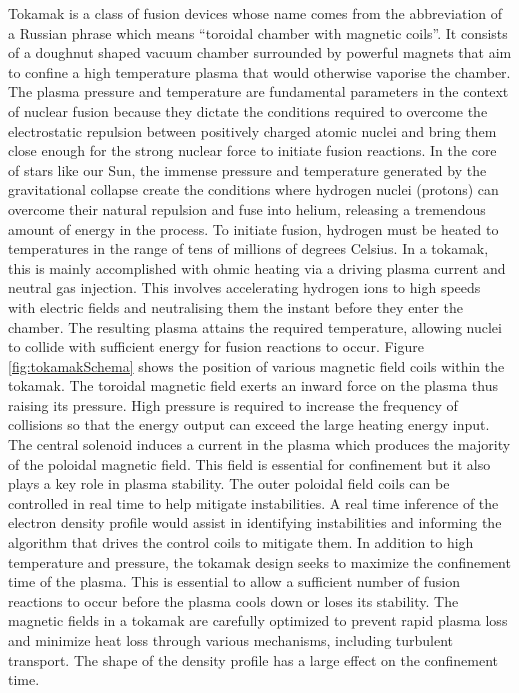 Tokamak is a class of fusion devices whose name comes from the abbreviation of a Russian phrase which means ``toroidal chamber with magnetic coils''. It consists of a doughnut shaped vacuum chamber surrounded by powerful magnets that aim to confine a high temperature plasma that would otherwise vaporise the chamber. The plasma pressure and temperature are fundamental parameters in the context of nuclear fusion because they dictate the conditions required to overcome the electrostatic repulsion between positively charged atomic nuclei and bring them close enough for the strong nuclear force to initiate fusion reactions. In the core of stars like our Sun, the immense pressure and temperature generated by the gravitational collapse create the conditions where hydrogen nuclei (protons) can overcome their natural repulsion and fuse into helium, releasing a tremendous amount of energy in the process. To initiate fusion, hydrogen must be heated to temperatures in the range of tens of millions of degrees Celsius. In a tokamak, this is mainly accomplished with ohmic heating via a driving plasma current and neutral gas injection. This involves accelerating hydrogen ions to high speeds with electric fields and neutralising them the instant before they enter the chamber. The resulting plasma attains the required temperature, allowing nuclei to collide with sufficient energy for fusion reactions to occur. Figure \ref{fig:tokamakSchema} shows the position of various magnetic field coils within the tokamak. The toroidal magnetic field exerts an inward force on the plasma thus raising its pressure. High pressure is required to increase the frequency of collisions so that the energy output can exceed the large heating energy input. The central solenoid induces a current in the plasma which produces the majority of the poloidal magnetic field. This field is essential for confinement but it also plays a key role in plasma stability. The outer poloidal field coils can be controlled in real time to help mitigate instabilities. A real time inference of the electron density profile would assist in identifying instabilities and informing the algorithm that drives the control coils to mitigate them. In addition to high temperature and pressure, the tokamak design seeks to maximize the confinement time of the plasma. This is essential to allow a sufficient number of fusion reactions to occur before the plasma cools down or loses its stability. The magnetic fields in a tokamak are carefully optimized to prevent rapid plasma loss and minimize heat loss through various mechanisms, including turbulent transport. The shape of the density profile has a large effect on the confinement time.

